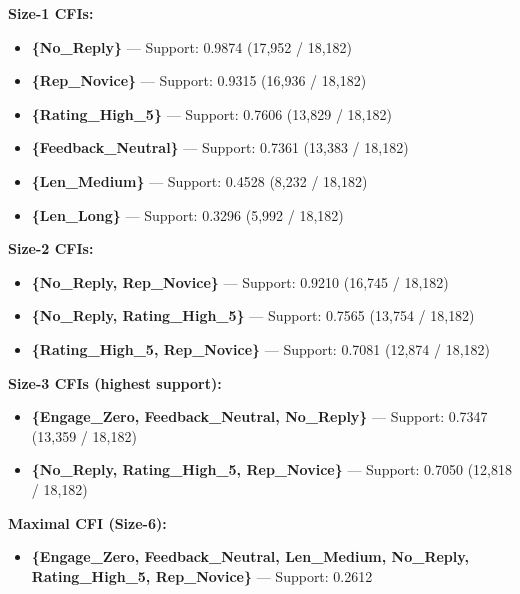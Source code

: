 \documentclass[12pt,a4paper]{article}
\begin{document}
\begin{cfibox}[Top Closed Frequent Itemsets (min\_support = 10\%)]

\textbf{Size-1 CFIs:}
\begin{itemize}[nosep]
    \item \textbf{\{No\_Reply\}} --- Support: 0.9874 (17{,}952 / 18{,}182)
    \item \textbf{\{Rep\_Novice\}} --- Support: 0.9315 (16{,}936 / 18{,}182)
    \item \textbf{\{Rating\_High\_5\}} --- Support: 0.7606 (13{,}829 / 18{,}182)
    \item \textbf{\{Feedback\_Neutral\}} --- Support: 0.7361 (13{,}383 / 18{,}182)
    \item \textbf{\{Len\_Medium\}} --- Support: 0.4528 (8{,}232 / 18{,}182)
    \item \textbf{\{Len\_Long\}} --- Support: 0.3296 (5{,}992 / 18{,}182)
\end{itemize}

\vspace{6pt}
\textbf{Size-2 CFIs:}
\begin{itemize}[nosep]
    \item \textbf{\{No\_Reply, Rep\_Novice\}} --- Support: 0.9210 (16{,}745 / 18{,}182)
    \item \textbf{\{No\_Reply, Rating\_High\_5\}} --- Support: 0.7565 (13{,}754 / 18{,}182)
    \item \textbf{\{Rating\_High\_5, Rep\_Novice\}} --- Support: 0.7081 (12{,}874 / 18{,}182)
\end{itemize}

\vspace{6pt}
\textbf{Size-3 CFIs (highest support):}
\begin{itemize}[nosep]
    \item \textbf{\{Engage\_Zero, Feedback\_Neutral, No\_Reply\}} --- Support: 0.7347 (13{,}359 / 18{,}182)
    \item \textbf{\{No\_Reply, Rating\_High\_5, Rep\_Novice\}} --- Support: 0.7050 (12{,}818 / 18{,}182)
\end{itemize}

\vspace{6pt}
\textbf{Maximal CFI (Size-6):}
\begin{itemize}[nosep]
    \item \textbf{\{Engage\_Zero, Feedback\_Neutral, Len\_Medium, No\_Reply, Rating\_High\_5, Rep\_Novice\}} --- Support: 0.2612
\end{itemize}
\end{cfibox}
\end{document}
